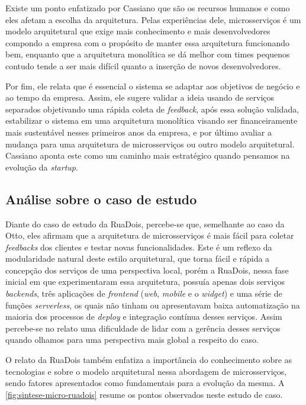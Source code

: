 Existe um ponto enfatizado por Cassiano que são os recursos humanos e como eles afetam a escolha da
arquitetura. Pelas experiências dele, microsserviços é um modelo arquitetural que exige mais conhecimento
e mais desenvolvedores compondo a empresa com o propósito de manter essa arquitetura funcionando bem,
enquanto que a arquitetura monolítica se dá melhor com times pequenos contudo tende a ser mais difícil
quanto a inserção de novos desenvolvedores.

Por fim, ele relata que é essencial o sistema se adaptar aos objetivos de negócio e ao tempo da
empresa. Assim, ele sugere validar a ideia usando de serviços separados objetivando uma rápida coleta de
\textit{feedback}, após essa solução validada, estabilizar o sistema em uma arquitetura monolítica
visando ser financeiramente mais sustentável nesses primeiros anos da empresa, e por último avaliar
a mudança para uma arquitetura de microsserviços ou outro modelo arquitetural. Cassiano aponta este
como um caminho mais estratégico quando pensamos na evolução da \textit{startup}.

\subsection{Análise sobre o caso de estudo}

Diante do caso de estudo da RuaDois, percebe-se que, semelhante ao caso da Otto, eles afirmam que a
arquitetura de microsserviços é mais fácil para coletar \textit{feedbacks} dos clientes e testar
novas funcionalidades. Este é um reflexo da modularidade natural deste estilo arquitetural, que
torna fácil e rápida a concepção dos serviços de uma perspectiva local, porém a RuaDois, nessa fase inicial
em que experimentaram essa arquitetura, possuía apenas dois serviços \textit{backends}, três
aplicações de \textit{frontend} (\textit{web}, \textit{mobile} e o \textit{widget}) e uma série de
funções \textit{serverless}, os quais não tinham ou apresentavam baixa automatização na maioria dos processos
de \textit{deploy} e integração contínua desses serviços. Assim percebe-se no relato uma dificuldade de
lidar com a gerência desses serviços quando olhamos para uma perspectiva mais global a respeito do caso.

O relato da RuaDois também enfatiza a importância do conhecimento sobre as tecnologias e sobre o
modelo arquitetural nessa abordagem de microsserviços, sendo fatores apresentados como fundamentais
para a evolução da mesma. A \autoref{fig:sintese-micro-ruadois} resume os pontos observados neste
estudo de caso.

